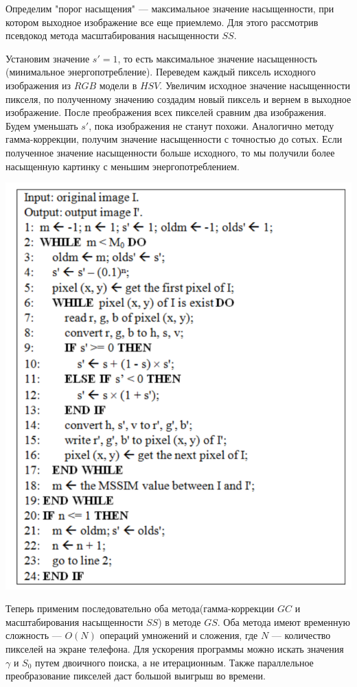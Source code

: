 \documentclass[a4paper, 12pt]{article}
\begin{document}
    Определим "порог насыщения" — максимальное значение насыщенности, при котором выходное изображение все еще приемлемо. Для этого рассмотрив псевдокод метода масштабирования насыщенности $SS$. 
    
    Установим значение $s' = 1$, то есть максимальное значение насыщенность (минимальное энергопотребление). Переведем каждый пиксель исходного изображения из $RGB$ модели в $HSV$. Увеличим исходное значение насыщенности пикселя, по полученному значению создадим новый пиксель и вернем в выходное изображение. После преображения всех пикселей сравним два изображения. Будем уменьшать $s'$, пока изображения не станут похожи. Аналогично методу гамма-коррекции, получим значение насыщенности с точностью до сотых. Если полученное значение насыщенности больше исходного, то мы получили более насыщенную картинку с меньшим энергопотреблением.
    
    \includegraphics[scale=0.6]{8}
    
    
    Теперь применим последовательно оба метода(гамма-коррекции $GC$ и масштабирования насыщенности $SS$) в методе $GS$. Оба метода имеют временную сложность — $O(N)$ операций умножений и сложения, где $N$ — количество пикселей на экране телефона.
    Для ускорения программы можно искать значения $\gamma$ и $S_0$ путем двоичного поиска, а не итерационным. Также параллельное преобразование пикселей даст большой выигрыш во времени. 
\end{document}
